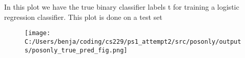 %
%


\begin{answer}
	In this plot we have the true binary classifier labels t for training a logistic regression classifier. This plot is done on a test set
	\begin{figure}[H]
		\texttt{[image: C:/Users/benja/coding/cs229/ps1\_attempt2/src/posonly/outputs/posonly\_true\_pred\_fig.png]}
	\end{figure}
	
\end{answer}
%